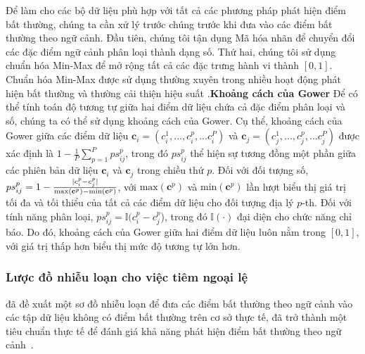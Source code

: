 Để làm cho các bộ dữ liệu phù hợp với tất cả các phương pháp phát hiện điểm bất thường, chúng ta cần xử lý trước chúng trước khi đưa vào các điểm bất thường theo ngữ cảnh. Đầu tiên, chúng tôi tận dụng Mã hóa nhãn \citep{seger2018investigation} để chuyển đổi các đặc điểm ngữ cảnh phân loại thành dạng số. Thứ hai, chúng tôi sử dụng chuẩn hóa Min-Max để mở rộng tất cả các đặc trưng hành vi thành $[0,1]$. Chuẩn hóa Min-Max được sử dụng thường xuyên trong nhiều hoạt động phát hiện bất thường và thường cải thiện hiệu suất \citep{kandanaarachchi2020normalization}.\textbf{Khoảng cách của Gower} Để có thể tính toán độ tương tự giữa hai điểm dữ liệu chứa cả đặc điểm phân loại và số, chúng ta có thể sử dụng khoảng cách \citep{gower1971general} của Gower. Cụ thể, khoảng cách của Gower giữa các điểm dữ liệu $\mathbf{c}_{i} = (c_{i}^{1},...,c_{i}^{p},...c_{i}^{P})$ và $\mathbf{c}_{j} = (c_{j}^{1},...,c_{j}^{p},...c_{j}^{P})$ được xác định là $1- \frac{1}{P}\sum_{p=1}^{P}ps_{ij}^{p}$, trong đó $ps_{ij}^{p}$ thể hiện sự tương đồng một phần giữa các phiên bản dữ liệu $\mathbf{c}_{i}$ và $\mathbf{c}_{j}$ trong chiều thứ $p$. Đối với đối tượng số, $ps_{ij}^{p} = 1- \frac{\lvert c_{i}^{p}-c_{j}^{p}\rvert}{\mathrm{max}(\mathbf{c}^p)-\mathrm{min}(\mathbf{c}^p)}$, với $\mathrm{max}(\mathbf{c}^p)$ và $\mathrm{min}(\mathbf{c}^p)$ lần lượt biểu thị giá trị tối đa và tối thiểu của tất cả các điểm dữ liệu cho đối tượng địa lý $p$-th. Đối với tính năng phân loại, $ps_{ij}^{p} = \mathbb{I}(c_{i}^p-c_{j}^p$), trong đó $\mathbb{I}(\cdot)$ đại diện cho chức năng chỉ báo. Do đó, khoảng cách của Gower giữa hai điểm dữ liệu luôn nằm trong $[0,1]$, với giá trị thấp hơn biểu thị mức độ tương tự lớn hơn.

\subsubsection{Lược đồ nhiễu loạn cho việc tiêm ngoại lệ}

\cite{song2007conditional} đã đề xuất một sơ đồ nhiễu loạn để đưa các điểm bất thường theo ngữ cảnh vào các tập dữ liệu không có điểm bất thường trên cơ sở thực tế, đã trở thành một tiêu chuẩn thực tế để đánh giá khả năng phát hiện điểm bất thường theo ngữ cảnh~\citep{song2007conditional, liang2016robust, zheng2017contextual, calikus2021wisdom}.



